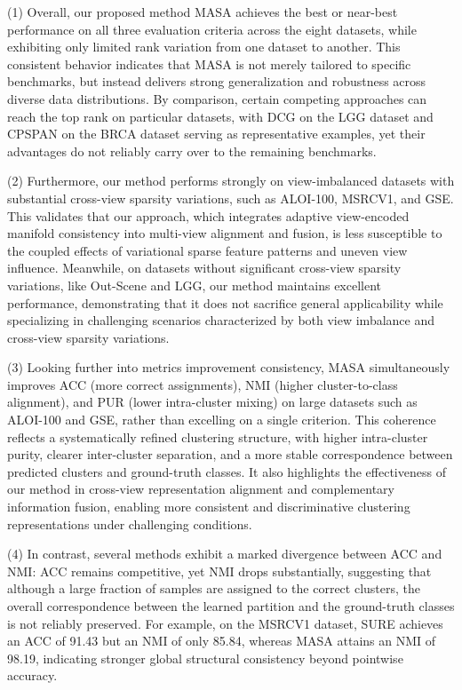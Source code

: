 \documentclass[10pt, journal, compsoc]{IEEEtran}
\begin{document}
(1) Overall, our proposed method MASA achieves the best or near-best performance on all three evaluation criteria across the eight datasets, while exhibiting only limited rank variation from one dataset to another. This consistent behavior indicates that MASA is not merely tailored to specific benchmarks, but instead delivers strong generalization and robustness across diverse data distributions. By comparison, certain competing approaches can reach the top rank on particular datasets, with DCG on the LGG dataset and CPSPAN on the BRCA dataset serving as representative examples, yet their advantages do not reliably carry over to the remaining benchmarks.

(2) Furthermore, our method performs strongly on view-imbalanced datasets with substantial cross-view sparsity variations, such as ALOI-100, MSRCV1, and GSE. This validates that our approach, which integrates adaptive view-encoded manifold consistency into multi-view alignment and fusion, is less susceptible to the coupled effects of variational sparse feature patterns and uneven view influence. Meanwhile, on datasets without significant cross-view sparsity variations, like Out-Scene and LGG, our method maintains excellent performance, demonstrating that it does not sacrifice general applicability while specializing in challenging scenarios characterized by both view imbalance and cross-view sparsity variations.

(3) Looking further into metrics improvement consistency, MASA simultaneously improves ACC (more correct assignments), NMI (higher cluster-to-class alignment), and PUR (lower intra-cluster mixing) on large datasets such as ALOI-100 and GSE, rather than excelling on a single criterion. This coherence reflects a systematically refined clustering structure, with higher intra-cluster purity, clearer inter-cluster separation, and a more stable correspondence between predicted clusters and ground-truth classes. It also highlights the effectiveness of our method in cross-view representation alignment and complementary information fusion, enabling more consistent and discriminative clustering representations under challenging conditions.

(4) In contrast, several methods exhibit a marked divergence between ACC and NMI: ACC remains competitive, yet NMI drops substantially, suggesting that although a large fraction of samples are assigned to the correct clusters, the overall correspondence between the learned partition and the ground-truth classes is not reliably preserved. For example, on the MSRCV1 dataset, SURE achieves an ACC of 91.43 but an NMI of only 85.84, whereas MASA attains an NMI of 98.19, indicating stronger global structural consistency beyond pointwise accuracy.
\end{document}
